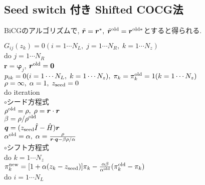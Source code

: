 \documentclass[12pt,titlepage]{jarticle}
\begin{document}
\subsection{Seed switch 付き Shifted COCG法}

BiCGのアルゴリズムで, ${\tilde {\boldsymbol r}} = {\boldsymbol r}^*,\; 
{\tilde {\boldsymbol r}}^{\rm old} = {\boldsymbol r}^{{\rm old}*}$とすると得られる.

\noindent
$G_{i j}(z_k) = 0 (i=1 \cdots N_L,\; j = 1 \cdots N_R,\; k=1 \cdots N_z)$
\\
do $j = 1 \cdots N_R$
\\\hspace{0.5cm}
${\boldsymbol r} = {\boldsymbol \varphi_j}$, 
${\boldsymbol r}^{\rm old} = {\bf 0}$
\\\hspace{0.5cm}
$p_{i k} = 0(i=1 \cdots N_L,\; k=1 \cdots N_z),\; \pi_k=\pi_k^{\rm old} = 1(k=1 \cdots N_z)$ 
\\\hspace{0.5cm}
$\rho = \infty,\; \alpha = 1,\; z_{\rm seed}=0$ 
\\\hspace{0.5cm}
do iteration
\\\hspace{1.0cm}
$\circ$シード方程式
\\\hspace{1.0cm}
$\rho^{\rm old} = \rho,\; \rho = {\boldsymbol r} \cdot {\boldsymbol r}$
\\\hspace{1.0cm}
$\beta = \rho / \rho^{\rm old}$
\\\hspace{1.0cm}
${\boldsymbol q} = (z_{\rm seed} {\hat I} - {\hat H}){\boldsymbol r}$
\\\hspace{1.0cm}
$\alpha^{\rm old} = \alpha,\; 
\alpha = \frac{\rho}{{\boldsymbol r}\cdot{\boldsymbol q} - \beta \rho / \alpha }$
\\\hspace{1.0cm}
$\circ$シフト方程式
\\\hspace{1.0cm}
do $k = 1 \cdots N_z$
\\\hspace{1.5cm}
$\pi_k^{\rm new} = [1+\alpha(z_k-z_{\rm seed})]\pi_k - \frac{\alpha \beta}{\alpha^{\rm old}}(\pi_k^{\rm old} - \pi_k)$
\\\hspace{1.5cm}
do $i = 1 \cdots N_L$
\\\hspace{2.0cm}
\end{document}
